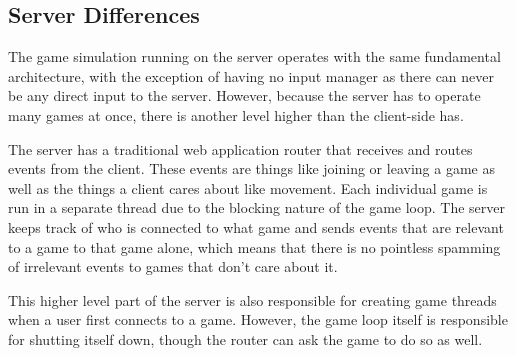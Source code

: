 \subsection{Server Differences}
The game simulation running on the server operates with the same fundamental architecture, with the exception of having no input manager as there can never be any direct input to the server. However, because the server has to operate many games at once, there is another level higher than the client-side has.

The server has a traditional web application router that receives and routes events from the client. These events are things like joining or leaving a game as well as the things a client cares about like movement. Each individual game is run in a separate thread due to the blocking nature of the game loop. The server keeps track of who is connected to what game and sends events that are relevant to a game to that game alone, which means that there is no pointless spamming of irrelevant events to games that don't care about it.

This higher level part of the server is also responsible for creating game threads when a user first connects to a game. However, the game loop itself is responsible for shutting itself down, though the router can ask the game to do so as well.





